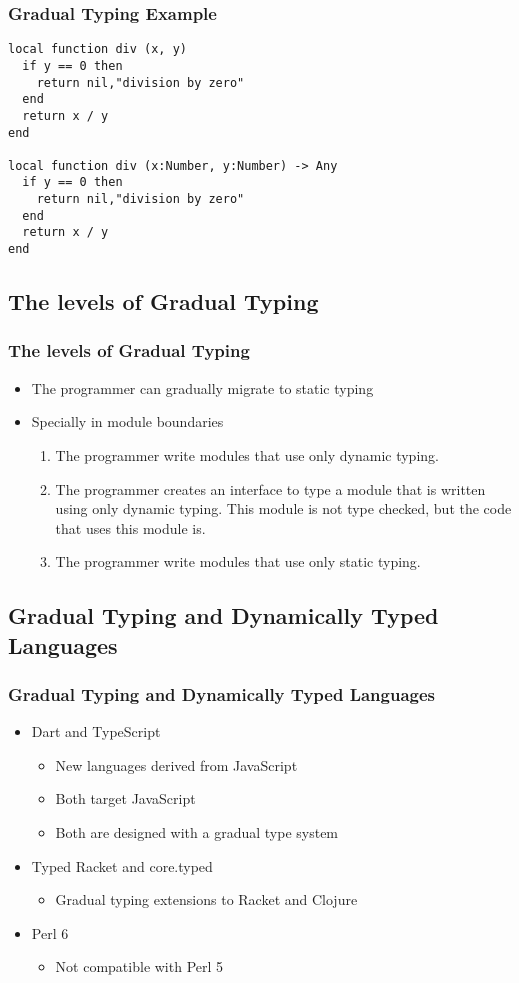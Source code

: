 \documentclass{beamer}
\begin{document}
\begin{frame}[fragile]
\frametitle{Gradual Typing Example}
\begin{verbatim}
local function div (x, y)
  if y == 0 then
    return nil,"division by zero"
  end
  return x / y
end

local function div (x:Number, y:Number) -> Any
  if y == 0 then
    return nil,"division by zero"
  end
  return x / y
end
\end{verbatim}
\end{frame}

\subsection{The levels of Gradual Typing}
\begin{frame}
\frametitle{The levels of Gradual Typing}
\begin{itemize}
\item The programmer can gradually migrate to static typing
\item Specially in module boundaries
\begin{enumerate}
\item The programmer write modules that use only dynamic typing.
\item The programmer creates an interface to type a module that
is written using only dynamic typing. This module is not
type checked, but the code that uses this module is.
\item The programmer write modules that use only static typing.
\end{enumerate}
\end{itemize}
\end{frame}

\subsection{Gradual Typing and Dynamically Typed Languages}
\begin{frame}
\frametitle{Gradual Typing and Dynamically Typed Languages}
\begin{itemize}
\item Dart and TypeScript
\begin{itemize}
\item New languages derived from JavaScript
\item Both target JavaScript
\item Both are designed with a gradual type system
\end{itemize}
\item Typed Racket and core.typed
\begin{itemize}
\item Gradual typing extensions to Racket and Clojure
\end{itemize}
\item Perl 6
\begin{itemize}
\item Not compatible with Perl 5
\end{itemize}
\end{itemize}
\end{frame}
\end{document}
